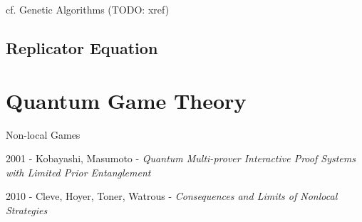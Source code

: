 cf. Genetic Algorithms (TODO: xref)



\subsection{Replicator Equation}\label{sec:replicator_equation}



\section{Quantum Game Theory}\label{sec:quantum_game_theory}

Non-local Games

2001 - Kobayashi, Masumoto - \emph{Quantum Multi-prover Interactive Proof
  Systems with Limited Prior Entanglement}

2010 - Cleve, Hoyer, Toner, Watrous -
\emph{Consequences and Limits of Nonlocal Strategies}

